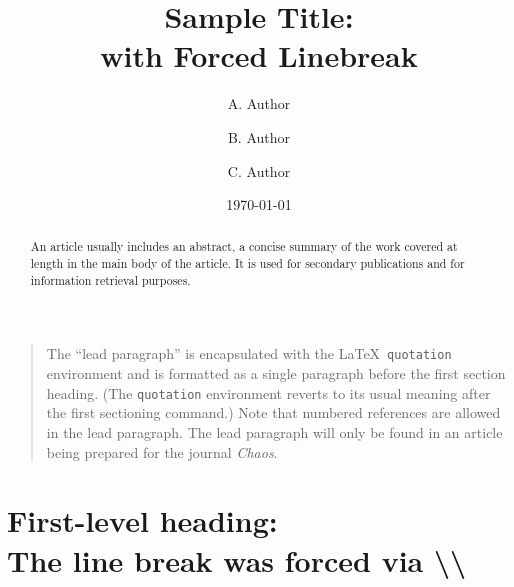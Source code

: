 \documentclass[%
 aip,
 amsmath,amssymb,
 reprint,%
]{revtex4-2}
\begin{document}

\title[Sample title]{Sample Title:\\with Forced Linebreak}
\author{A. Author}
\author{B. Author}%
%

\author{C. Author}
%

\date{\today}%

\begin{abstract}
An article usually includes an abstract, a concise summary of the work
covered at length in the main body of the article. It is used for
secondary publications and for information retrieval purposes. 
\end{abstract}

\maketitle

\begin{quotation}
The ``lead paragraph'' is encapsulated with the \LaTeX\ 
\verb+quotation+ environment and is formatted as a single paragraph before the first section heading. 
(The \verb+quotation+ environment reverts to its usual meaning after the first sectioning command.) 
Note that numbered references are allowed in the lead paragraph.
%
The lead paragraph will only be found in an article being prepared for the journal \textit{Chaos}.
\end{quotation}

\section{\label{sec:level1}First-level heading:\protect\\ The line
break was forced \lowercase{via} \textbackslash\textbackslash}
\end{document}
